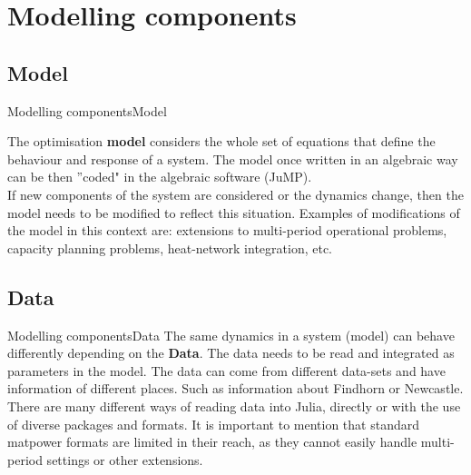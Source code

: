 \documentclass[handout]{beamer}
\begin{document}


\section{Modelling components}

\subsection{Model}
\begin{frame}[t]{Modelling components}{Model}

  The optimisation \textbf{model} considers the whole set of equations that define the behaviour and response of a system. The model once written in an algebraic way can be then ''coded" in the algebraic software (JuMP).\\[6pt]

  If new components of the system are considered or the dynamics change, then the model needs to be modified to reflect this situation. Examples of modifications of the model in this context are: extensions to multi-period operational problems, capacity planning problems, heat-network integration, etc.
\end{frame}

\subsection{Data}
\begin{frame}[t]{Modelling components}{Data}
  The same dynamics in a system (model) can behave differently depending on the \textbf{Data}. The data needs to be read and integrated as parameters in the model. The data can come from different data-sets and have information of different places. Such as information about Findhorn or Newcastle.\\[6pt]

  There are many different ways of reading data into Julia, directly or with the use of diverse packages and formats. It is important to mention that standard matpower formats are limited in their reach, as they cannot easily handle multi-period settings or other extensions.

\end{frame}
\end{document}
